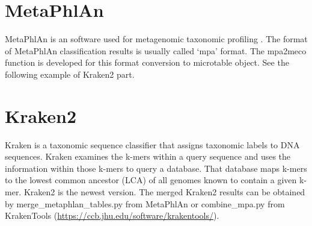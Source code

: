 \documentclass[
]{book}
\newenvironment{Shaded}{\begin{snugshade}}{\end{snugshade}}
\newcommand{\AttributeTok}[1]{\textcolor[rgb]{0.77,0.63,0.00}{#1}}
\newcommand{\CommentTok}[1]{\textcolor[rgb]{0.56,0.35,0.01}{\textit{#1}}}
\newcommand{\FloatTok}[1]{\textcolor[rgb]{0.00,0.00,0.81}{#1}}
\newcommand{\FunctionTok}[1]{\textcolor[rgb]{0.00,0.00,0.00}{#1}}
\newcommand{\NormalTok}[1]{#1}
\newcommand{\OtherTok}[1]{\textcolor[rgb]{0.56,0.35,0.01}{#1}}
\newcommand{\SpecialCharTok}[1]{\textcolor[rgb]{0.00,0.00,0.00}{#1}}
\newcommand{\StringTok}[1]{\textcolor[rgb]{0.31,0.60,0.02}{#1}}
\begin{document}
\begin{Shaded}
\end{Shaded}

\hypertarget{metaphlan}{%
\section{MetaPhlAn}\label{metaphlan}}

MetaPhlAn is an software used for metagenomic taxonomic profiling \citep{Truong_MeTApHLaN2_2015}.
The format of MetaPhlAn classification results is usually called `mpa' format.
The mpa2meco function is developed for this format conversion to microtable object.
See the following example of Kraken2 part.

\hypertarget{kraken2}{%
\section{Kraken2}\label{kraken2}}

Kraken is a taxonomic sequence classifier that assigns taxonomic labels to DNA sequences.
Kraken examines the k-mers within a query sequence and uses the information within those k-mers to query a database.
That database maps k-mers to the lowest common ancestor (LCA) of all genomes known to contain a given k-mer.
Kraken2 \citep{Wood_Improved_2019} is the newest version.
The merged Kraken2 results can be obtained by merge\_metaphlan\_tables.py from MetaPhlAn or combine\_mpa.py from KrakenTools (\url{https://ccb.jhu.edu/software/krakentools/}).
\end{document}
